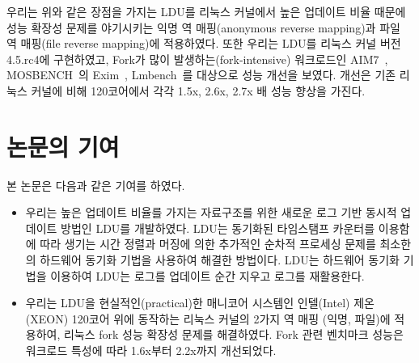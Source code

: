우리는 위와 같은 장점을 가지는 LDU를 리눅스 커널에서 높은 업데이트 비율 때문에 성능 확장성 
문제를 야기시키는 익명 역 매핑(anonymous reverse mapping)과 파일 역 매핑(file reverse mapping)에
적용하였다.
또한 우리는 LDU를 리눅스 커널 버전 4.5.rc4에 구현하였고, Fork가 많이 발생하는(fork-intensive) 워크로드인
AIM7~\cite{AIM7Benchmark}, MOSBENCH~\cite{MOSBENCH}의 Exim~\cite{Exim},
Lmbench~\cite{mcvoy1996lmbench}를 대상으로 성능 개선을 보였다.
개선은 기존 리눅스 커널에 비해 120코어에서 각각 1.5x, 2.6x, 2.7x 배 성능 향상을 가진다.

\newpage
\section{논문의 기여}\label{sec:introcontri}
본 논문은 다음과 같은 기여를 하였다.
\begin{itemize}
\item 우리는 높은 업데이트 비율를 가지는 자료구조를 위한 새로운 로그 기반 동시적 업데이트
 방법인 LDU를 개발하였다.
LDU는 동기화된 타임스탬프 카운터를 이용함에 따라 생기는 시간 정렬과 머징에 의한 추가적인
순차적 프로세싱 문제를 최소한의 하드웨어 동기화 기법을 사용하여 해결한 방법이다.
LDU는 하드웨어 동기화 기법을 이용하여 LDU는 로그를 업데이트 순간 지우고 로그를
재활용한다.
\item 
우리는 LDU을 현실적인(practical)한 매니코어 시스템인 인텔(Intel) 제온(XEON)
 120코어 위에 동작하는 리눅스 커널의 2가지 역 매핑 (익명, 파일)에 적용하여, 리눅스 fork
 성능 확장성 문제를 해결하였다.
Fork 관련 벤치마크 성능은 워크로드 특성에 따라 1.6x부터 2.2x까지 개선되었다.
\end{itemize}
